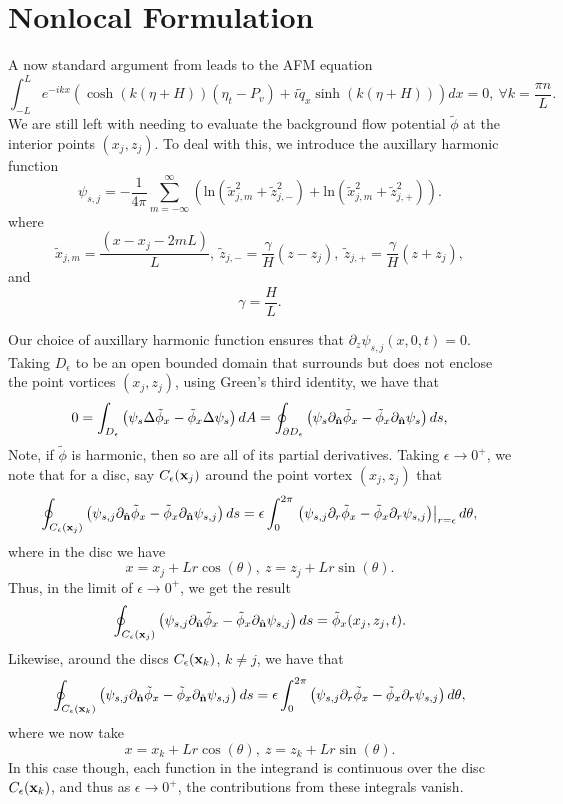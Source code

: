 \documentclass[a4paper,11pt]{article}
\newcommand{\p}{\partial}
\begin{document}
\section*{Nonlocal Formulation}
A now standard argument from \cite{afm} leads to the AFM equation 
\[
\int_{-L}^{L} e^{-ik x}\left(\cosh( k(  \eta+H))\left(\eta_{t} - P_{v} \right) + i\tilde{q}_{x}\sinh(k( \eta+H))\right) dx = 0, ~ \forall k = \frac{\pi n}{L}.
\]
We are still left with needing to evaluate the background flow potential $\tilde{\phi}$ at the interior points $(x_{j}, z_{j})$.  To deal with this, we introduce the auxillary harmonic function 
\[
\psi_{s,j} = - \frac{1}{4\pi}\sum_{m=-\infty}^{\infty} \left( \mbox{ln}\left( \tilde{x}_{j,m}^{2} + \tilde{z}_{j,-}^{2}  \right) + \mbox{ln}\left( \tilde{x}_{j,m}^{2} + \tilde{z}_{j,+}^{2} \right)\right).
\]
where
\[
\tilde{x}_{j,m} = \frac{(x-x_{j}-2mL)}{L}, ~ \tilde{z}_{j,-} = \frac{\gamma}{H}(z-z_{j}), ~ \tilde{z}_{j,+} = \frac{\gamma}{H}(z+z_{j}),
\]
and
\[
\gamma = \frac{H}{L}.
\]

Our choice of auxillary harmonic function ensures that $\p_{z}\psi_{s,j}(x,0,t)=0$.  Taking $D_{\epsilon}$ to be an open bounded domain that surrounds but does not enclose the point vortices $(x_{j},z_{j})$, using Green's third identity, we have that 
\[
0 =  \int_{D_{\epsilon}}\left(\psi_{s}\Delta \tilde{\phi}_{x} - \tilde{\phi}_{x}\Delta\psi_{s} \right) dA =  \oint_{\p D_{\epsilon}} \left(\psi_{s}\p_{\hat{{\bf n}}}\tilde{\phi}_{x}-\tilde{\phi}_{x}\p_{\hat{{\bf n}}}\psi_{s} \right) ds,
\]
Note, if $\tilde{\phi}$ is harmonic, then so are all of its partial derivatives.  Taking $\epsilon \rightarrow 0^{+}$, we note that for a disc, say $C_{\epsilon}({\bf x}_{j})$  around the point vortex $(x_{j},z_{j})$ that 
\[
 \oint_{C_{\epsilon}({\bf x}_{j})} \left(\psi_{s,j}\p_{\hat{{\bf n}}}\tilde{\phi}_{x}-\tilde{\phi}_{x}\p_{\hat{{\bf n}}}\psi_{s,j} \right) ds =  \epsilon\int_{0}^{2\pi}\left.\left(\psi_{s,j}\p_{r}\tilde{\phi}_{x}- \tilde{\phi}_{x}\p_{r}\psi_{s,j} \right)\right|_{r=\epsilon} d\theta, 
\]
where in the disc we have 
\[
x = x_{j} + L r\cos(\theta), ~ z = z_{j} +  L r\sin(\theta).
\]
Thus, in the limit of $\epsilon\rightarrow 0^{+}$, we get the result 
\[
\oint_{C_{\epsilon}({\bf x}_{j})} \left(\psi_{s,j}\p_{\hat{{\bf n}}}\tilde{\phi}_{x}-\tilde{\phi}_{x}\p_{\hat{{\bf n}}}\psi_{s,j} \right) ds =\tilde{\phi}_{x}(x_{j},z_{j},t).
\]
Likewise, around the discs $C_{\epsilon}({\bf x}_{k})$, $k\neq j$, we have that 
\[
 \oint_{C_{\epsilon}({\bf x}_{k})} \left(\psi_{s,j}\p_{\hat{{\bf n}}}\tilde{\phi}_{x}-\tilde{\phi}_{x}\p_{\hat{{\bf n}}}\psi_{s,j} \right) ds = \epsilon\int_{0}^{2\pi}\left(\psi_{s,j}\p_{r}\tilde{\phi}_{x}- \tilde{\phi}_{x}\p_{r}\psi_{s,j} \right)d\theta, 
\]
where we now take 
\[
x = x_{k} + L r\cos(\theta), ~ z = z_{k} +  L r\sin(\theta).
\]
In this case though, each function in the integrand is continuous over the disc $C_{\epsilon}({\bf x}_{k})$, and thus as $\epsilon \rightarrow 0^{+}$, the contributions from these integrals vanish.  
\end{document}

